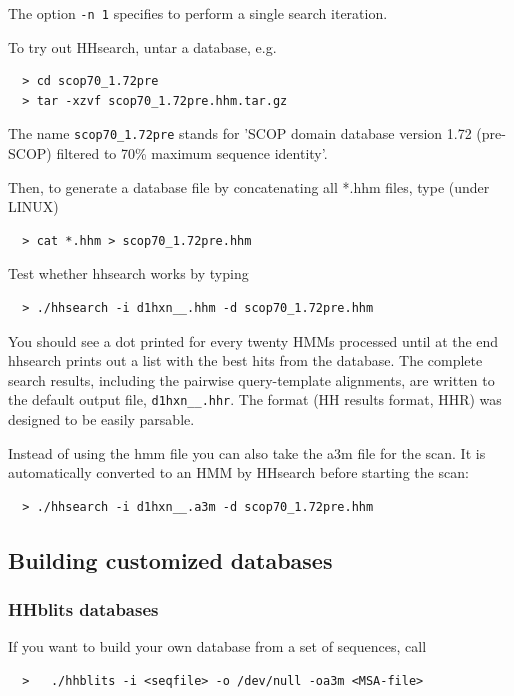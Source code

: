 \documentclass[11pt,a4paper]{article}
\begin{document}
The option \verb`-n 1` specifies to perform a single search iteration.

To try out HHsearch, untar a database, e.g.
\begin{verbatim}
  > cd scop70_1.72pre
  > tar -xzvf scop70_1.72pre.hhm.tar.gz
\end{verbatim}

The name \verb`scop70_1.72pre` stands for 'SCOP domain database version 1.72 (pre-SCOP) 
filtered to 70\% maximum sequence identity'.

Then, to generate a database file by concatenating all *.hhm files, type (under LINUX)
\begin{verbatim}
  > cat *.hhm > scop70_1.72pre.hhm
\end{verbatim}

Test whether hhsearch works by typing
\begin{verbatim}
  > ./hhsearch -i d1hxn__.hhm -d scop70_1.72pre.hhm
\end{verbatim}

You should see a dot printed for every twenty HMMs processed until at the end 
hhsearch prints out a list with the best hits from the database. The complete 
search results, including the pairwise query-template alignments, are written to the 
default output file, \verb`d1hxn__.hhr`. The format (HH results format, HHR) was 
designed to be easily parsable.

Instead of using the hmm file you can also take the a3m file for the scan. It is 
automatically converted to an HMM by HHsearch before starting the scan:
\begin{verbatim}
  > ./hhsearch -i d1hxn__.a3m -d scop70_1.72pre.hhm
\end{verbatim}



\subsection{Building customized databases}

\subsubsection{HHblits databases}

If you want to build your own database from a set of sequences, call 
\begin{verbatim}
  >   ./hhblits -i <seqfile> -o /dev/null -oa3m <MSA-file>
\end{verbatim}
\end{document}
